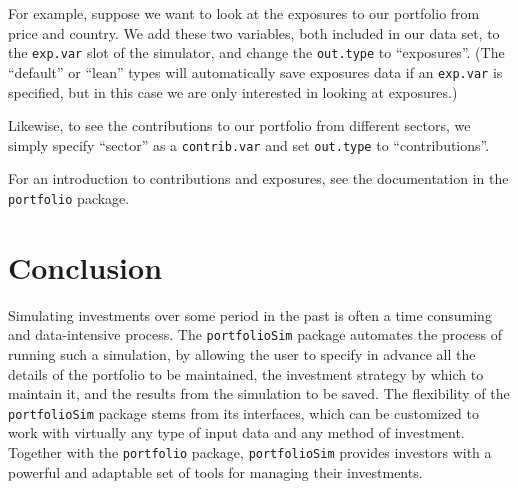 \documentclass{article}
\begin{document}
For example, suppose we want to look at the exposures to our portfolio
from price and country.  We add these two variables, both included in
our data set, to the \texttt{exp.var} slot of the simulator, and
change the \texttt{out.type} to ``exposures''.  (The ``default'' or
``lean'' types will automatically save exposures data if an
\texttt{exp.var} is specified, but in this case we are only interested
in looking at exposures.)




Likewise, to see the contributions to our portfolio from different
sectors, we simply specify ``sector'' as a \texttt{contrib.var} and
set \texttt{out.type} to ``contributions''.



For an introduction to contributions and exposures, see the
documentation in the \texttt{portfolio} package.

\section{Conclusion}

Simulating investments over some period in the past is often a time
consuming and data-intensive process.  The \texttt{portfolioSim}
package automates the process of running such a simulation, by
allowing the user to specify in advance all the details of the
portfolio to be maintained, the investment strategy by which to
maintain it, and the results from the simulation to be saved.  The
flexibility of the \texttt{portfolioSim} package stems from its
interfaces, which can be customized to work with virtually any type of
input data and any method of investment.  Together with the
\texttt{portfolio} package, \texttt{portfolioSim} provides investors
with a powerful and adaptable set of tools for managing their
investments.
\end{document}
